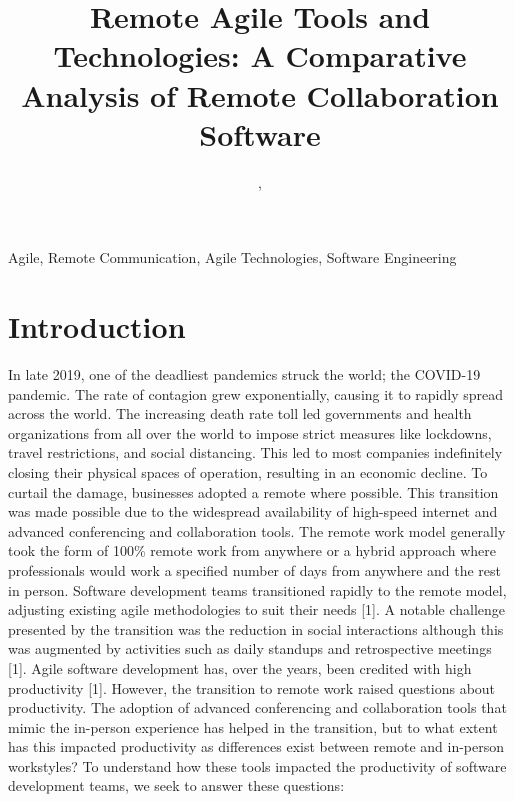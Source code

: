 \documentclass[conference]{IEEEtran}
\begin{document}
\title{Remote Agile Tools and Technologies: A Comparative Analysis of Remote Collaboration Software\\
}

\author{,

}
\maketitle

\begin{IEEEkeywords}
Agile, Remote Communication, Agile Technologies, Software Engineering
\end{IEEEkeywords}

\section{Introduction}
In late 2019, one of the deadliest pandemics struck the world; the COVID-19 pandemic. The rate of contagion grew exponentially, causing it to rapidly spread across the world. The increasing death rate toll led governments and health organizations from all over the world to impose strict measures like lockdowns, travel restrictions, and social distancing. This led to most companies indefinitely closing their physical spaces of operation, resulting in an economic decline. To curtail the damage, businesses adopted a remote where possible. This transition was made possible due to the widespread availability of high-speed internet and advanced conferencing and collaboration tools.
The remote work model generally took the form of 100\% remote work from anywhere or a hybrid approach where professionals would work a specified number of days from anywhere and the rest in person. Software development teams transitioned rapidly to the remote model, adjusting existing agile methodologies to suit their needs [1]. A notable challenge presented by the transition was the reduction in social interactions although this was augmented by activities such as daily standups and retrospective meetings [1].
Agile software development has, over the years, been credited with high productivity [1].  However, the transition to remote work raised questions about productivity. The adoption of advanced conferencing and collaboration tools that mimic the in-person experience has helped in the transition, but to what extent has this impacted productivity as differences exist between remote and in-person workstyles? To understand how these tools impacted the productivity of software development teams, we seek to answer these questions:
\end{document}
